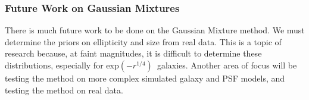 \documentclass[12pt]{article}
\newcommand{\devprof}{exp$(-r^{1/4})$}
\begin{document}
\subsubsection{Future Work on Gaussian Mixtures}

There is much future work to be done on the Gaussian Mixture method.  We must
determine the priors on ellipticity and size from real data.  This is a topic
of research because, at faint magnitudes, it is difficult to determine these
distributions, especially for \devprof\ galaxies\cite{Miller12}.  Another area
of focus will be testing the method on more complex simulated galaxy and PSF
models, and testing the method on real data.

\end{document}
